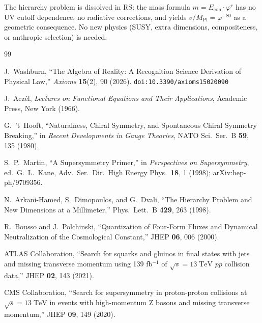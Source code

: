 \documentclass[12pt,a4paper]{article}
\theoremstyle{definition}
\theoremstyle{remark}
\begin{document}
The hierarchy problem is dissolved in RS: the mass formula
$m = E_{\mathrm{coh}} \cdot \varphi^r$ has no UV cutoff
dependence, no radiative corrections, and yields
$v/M_{\mathrm{Pl}} = \varphi^{-80}$ as a geometric consequence.
No new physics (SUSY, extra dimensions, compositeness, or
anthropic selection) is needed.

\begin{thebibliography}{99}

J.~Washburn, ``The Algebra of Reality: A Recognition Science Derivation
of Physical Law,'' \emph{Axioms} \textbf{15}(2), 90 (2026).
\texttt{doi:10.3390/axioms15020090}

J.~Acz\'el, \textit{Lectures on Functional Equations and Their
Applications}, Academic Press, New York (1966).

G.~'t~Hooft, ``Naturalness, Chiral Symmetry, and Spontaneous
Chiral Symmetry Breaking,'' in \textit{Recent Developments in
Gauge Theories}, NATO Sci.\ Ser.\ B \textbf{59}, 135 (1980).

S.~P.~Martin, ``A Supersymmetry Primer,'' in \textit{Perspectives
on Supersymmetry}, ed.\ G.~L.~Kane, Adv.\ Ser.\ Dir.\ High Energy
Phys.\ \textbf{18}, 1 (1998); arXiv:hep-ph/9709356.

N.~Arkani-Hamed, S.~Dimopoulos, and G.~Dvali, ``The Hierarchy
Problem and New Dimensions at a Millimeter,'' Phys.\ Lett.\ B
\textbf{429}, 263 (1998).

R.~Bousso and J.~Polchinski, ``Quantization of Four-Form Fluxes
and Dynamical Neutralization of the Cosmological Constant,''
JHEP \textbf{06}, 006 (2000).

ATLAS Collaboration, ``Search for squarks and gluinos in final
states with jets and missing transverse momentum using 139 fb$^{-1}$
of $\sqrt{s} = 13\;\mathrm{TeV}$ $pp$ collision data,''
JHEP \textbf{02}, 143 (2021).

CMS Collaboration, ``Search for supersymmetry in proton-proton
collisions at $\sqrt{s} = 13\;\mathrm{TeV}$ in events with
high-momentum Z bosons and missing transverse momentum,''
JHEP \textbf{09}, 149 (2020).

\end{thebibliography}
\end{document}
